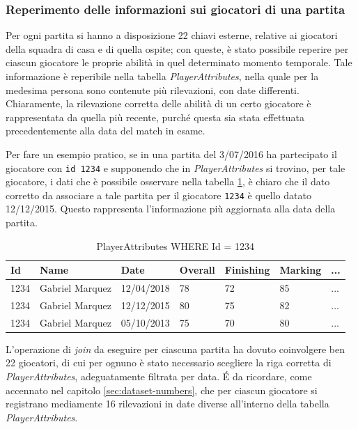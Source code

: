 \documentclass[hidelinks, 12pt]{article}
\begin{document}
\subsubsection{Reperimento delle informazioni sui giocatori di una partita}

Per ogni partita si hanno a disposizione 22 chiavi esterne, relative ai giocatori della squadra di casa e di quella ospite; con queste, è stato possibile reperire per ciascun giocatore le proprie abilità in quel determinato momento temporale. Tale informazione è reperibile nella tabella \textit{PlayerAttributes}, nella quale per la medesima persona sono contenute più rilevazioni, con date differenti. Chiaramente, la rilevazione corretta delle abilità di un certo giocatore è rappresentata da quella più recente, purché questa sia stata effettuata precedentemente alla data del match in esame.

Per fare un esempio pratico, se in una partita del 3/07/2016 ha partecipato il giocatore con \texttt{id 1234} e supponendo che in \textit{PlayerAttributes} si trovino, per tale giocatore, i dati che è possibile osservare nella tabella \ref{tab:player_attr_example}, è chiaro che il dato corretto da associare a tale partita per il giocatore \texttt{1234} è quello datato 12/12/2015. Questo rappresenta l'informazione più aggiornata alla data della partita.

\begin{table}[H]
	\caption{PlayerAttributes WHERE Id = 1234}\label{tab:player_attr_example}
	\centering
	\begin{tabular}{|l|l|l|l|l|l|l|}
		\hline
		Id & Name & Date & Overall & Finishing & Marking & ... \\
		\hline
		1234 & Gabriel Marquez & 12/04/2018 & 78 & 72 & 85 & ... \\
		1234 & Gabriel Marquez & 12/12/2015 & 80 & 75 & 82 & ... \\
		1234 & Gabriel Marquez & 05/10/2013 & 75 & 70 & 80 & ... \\
		\hline
	\end{tabular}
\end{table}

L'operazione di \textit{join} da eseguire per ciascuna partita ha dovuto coinvolgere ben 22 giocatori, di cui per ognuno è stato necessario scegliere la riga corretta di \textit{PlayerAttributes}, adeguatamente filtrata per data. É da ricordare, come accennato nel capitolo \ref{sec:dataset-numbers}, che per ciascun giocatore si registrano mediamente 16 rilevazioni in date diverse all'interno della tabella \textit{PlayerAttributes}.
\end{document}
